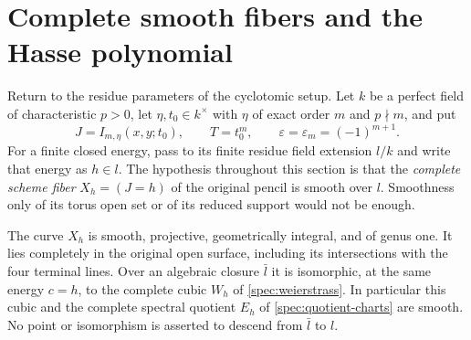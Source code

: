 \section{Complete smooth fibers and the Hasse polynomial}
\label{hasse:section}

Return to the residue parameters of the cyclotomic setup.  Let $k$
be a perfect field of characteristic $p>0$, let $\eta,t_0\in k^\times$
with $\eta$ of exact order $m$ and $p\nmid m$, and put
\[
J=I_{m,\eta}(x,y;t_0),\qquad T=t_0^m,\qquad
\varepsilon=\varepsilon_m=(-1)^{m+1}.
\]
For a finite closed energy, pass to its finite residue field
extension $l/k$ and write that energy as $h\in l$.
The hypothesis throughout this section is that the \emph{complete
scheme fiber} $X_h=(J=h)$ of the original pencil is smooth over $l$.
Smoothness only of its torus open set or of its reduced support
would not be enough.

\begin{theorem}\label{hasse:closed}
The curve $X_h$ is smooth, projective, geometrically integral, and
of genus one.  It lies completely in the original open surface,
including its intersections with the four terminal lines.
Over an algebraic closure $\bar l$ it is isomorphic, at the same
energy $c=h$, to the complete cubic $W_h$ of
\eqref{spec:weierstrass}.  In particular this cubic and the
complete spectral quotient $E_h$ of \eqref{spec:quotient-charts}
are smooth.  No point or isomorphism is asserted to descend from
$\bar l$ to $l$.
\end{theorem}

